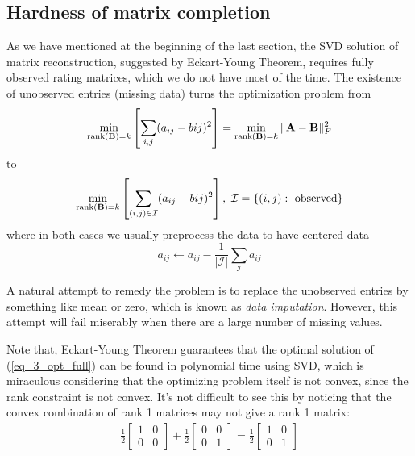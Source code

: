 \documentclass[../book-template.tex]{subfiles}
\begin{document}
\subsection{Hardness of matrix completion}
As we have mentioned at the beginning of the last section, the SVD solution of matrix reconstruction, suggested by Eckart-Young Theorem, requires fully observed rating matrices, which we do not have most of the time. The existence of unobserved entries (missing data) turns the optimization problem from
\begin{equation}\label{eq_3_opt_full}
	\min_{\operatorname{rank}({\bf B})=k}\left[\sum_{i,j}(a_{ij}-b{ij})^2 \right]=	\min_{\operatorname{rank}({\bf B})=k}\|{\bf A}-{\bf B}\|_F^2
\end{equation} 
to
\begin{equation}\label{eq_3_opt_partial}
\min_{\operatorname{rank}({\bf B})=k}\left[\sum_{(i,j)\in \mathcal{I}}(a_{ij}-b{ij})^2 \right],\ \mathcal{I}=\{(i,j):\ \text{observed}\}
\end{equation} 
where in both cases we usually preprocess the data to have centered data
$$a_{ij}\leftarrow a_{ij}-\frac{1}{|\mathcal{I}|}\sum_{\mathcal{I}}a_{ij}$$
\par A natural attempt to remedy the problem is to replace the unobserved entries by something like mean or zero, which is known as \emph{data imputation}. However, this attempt will fail miserably when there are a large number of missing values. 
\par Note that, Eckart-Young Theorem guarantees that the optimal solution of (\ref{eq_3_opt_full}) can be found in polynomial time using SVD, which is miraculous considering that the optimizing problem itself is not convex, since the rank constraint is not convex. It's not difficult to see this by noticing that the convex combination of rank 1 matrices may not give a rank 1 matrix:
\begin{equation*}
	\begin{gathered}
		\frac{1}{2}\begin{bmatrix}
		1 & 0 \\ 0 & 0
		\end{bmatrix} + 
		\frac{1}{2}\begin{bmatrix}
		0 & 0 \\ 0 & 1
		\end{bmatrix} =
		\frac{1}{2}\begin{bmatrix}
		1 & 0 \\ 0 & 1
		\end{bmatrix}
	\end{gathered}
\end{equation*}
\end{document}
